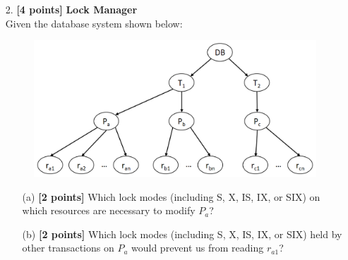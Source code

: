 \documentclass[10pt]{article}
\begin{document}
\begin{enumerate}
    \item[2.] \textbf{[4 points]} \textbf{Lock Manager} \\
        Given the database system shown below:
        \begin{figure}[ht]
            \centering
            \includegraphics[width=0.7\linewidth]{lock_mode}
        \end{figure}
        \begin{itemize}
            \item[(a)] \textbf{[2 points]} Which lock modes (including S, X, IS, IX, or SIX) on which resources are necessary to modify $P_a$? \\
            \item[(b)] \textbf{[2 points]} Which lock modes (including S, X, IS, IX, or SIX) held by other transactions on $P_a$ would prevent us from reading $r_{a1}$? \\
        \end{itemize}
\end{enumerate}





\newpage
\end{document}
